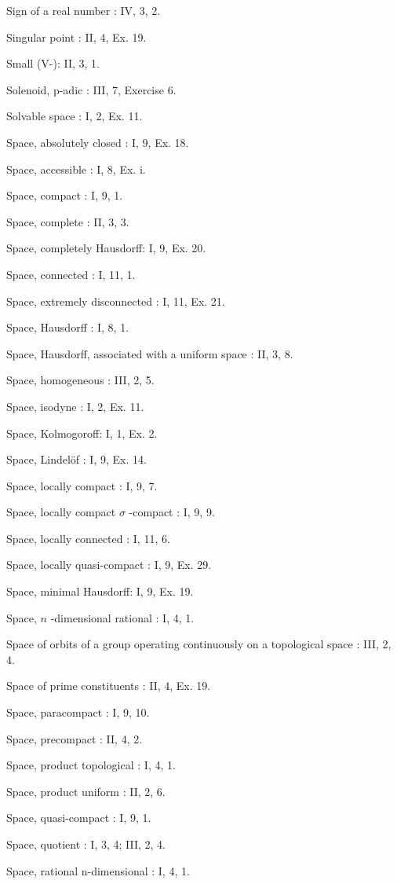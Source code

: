 Sign of a real number : IV, 3, 2.

Singular point : II, 4, Ex. 19.

Small (V-): II, 3, 1.

Solenoid, p-adic : III, 7, Exercise 6.

Solvable space : I, 2, Ex. 11.

Space, absolutely closed : I, 9, Ex. 18.

Space, accessible : I, 8, Ex. i.

Space, compact : I, 9, 1.

Space, complete : II, 3, 3.

Space, completely Hausdorff: I, 9, Ex. 20.

Space, connected : I, 11, 1.

Space, extremely disconnected : I, 11, Ex. 21.

Space, Hausdorff : I, 8, 1.

Space, Hausdorff, associated with a uniform space : II, 3, 8.

Space, homogeneous : III, 2, 5.

Space, isodyne : I, 2, Ex. 11.

Space, Kolmogoroff: I, 1, Ex. 2.

Space, Lindelöf : I, 9, Ex. 14.

Space, locally compact : I, 9, 7.

Space, locally compact \(\sigma\) -compact : I, 9, 9.

Space, locally connected : I, 11, 6.

Space, locally quasi-compact : I, 9, Ex. 29.

Space, minimal Hausdorff: I, 9, Ex. 19.

Space, \(n\) -dimensional rational : I, 4, 1.

Space of orbits of a group operating continuously on a topological space : III, 2, 4.

Space of prime constituents : II, 4, Ex. 19.

Space, paracompact : I, 9, 10.

Space, precompact : II, 4, 2.

Space, product topological : I, 4, 1.

Space, product uniform : II, 2, 6.

Space, quasi-compact : I, 9, 1.

Space, quotient : I, 3, 4; III, 2, 4.

Space, rational n-dimensional : I, 4, 1.

